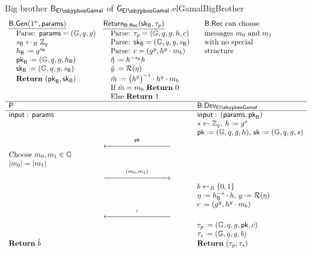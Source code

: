 \begin{intGame}{Big brother $\bb_{\elGamal}$ of $\cgame_{\elGamal}$.}{elGamalBigBrother}
\begin{align*}
\begin{array}{lll}
\underline{\bbgen(1^n,\params)} & \underline{\return_{\bbrec}(\bbsk,\ptrans)} & \quad\mbox{$\bbrec$ can choose} \\
\quad\mbox{Parse: } \params = (\cgroup,\order,\generator) & \quad\mbox{Parse: } \ptrans = (\cgroup,\order,\generator,h,c) & \quad\mbox{messages $m_0$ and $m_1$} \\
\quad s_{\bb}\unileft\Zq & \quad\mbox{Parse: } \bbsk = (\cgroup,\order,\generator,s_{\bb}) & \quad\mbox{with no special} \\
\quad h_{\bb} \defeq g^{s_{\bb}} & \quad\mbox{Parse: } c = (g^y,h^y\cdot m_b) & \quad\mbox{structure} \\
\quad \bbpk \defeq (\cgroup,\order,\generator,h_{\bb}) & \quad\hat{\eta}\defeq h^{-s_{\bb}}h &  \\
\quad \bbsk \defeq (\cgroup,\order,\generator,s_{\bb}) & \quad \hat{y} \defeq \RO(\eta) & \\
\quad\mbox{\Ret } (\bbpk,\bbsk) & \quad \hat{m} \defeq \left(h^{\hat{y}}\right)^{-1}\cdot h^y\cdot m_b & \\
 & \quad\mbox{If } \hat{m} = m_0 \mbox{ \Ret } 0 & \\
 & \quad\mbox{Else \Ret } 1 & \\
\hline \party &  & \bbdev_{\elGamal} \\ 
\hline \I: \, \params &  & \I:\,(\params,\bbpk) \\ 
 &  & s\leftarrow\Zq,\: h\defeq g^s \\
 & & \pk \defeq (\cgroup,\order,\generator,h),\, \sk \defeq (\cgroup,\order,\generator,s) \\
 & \longleftar{\pk}{3} &  \\
\mbox{Choose } m_0,m_1\in\cgroup & & \\
\vert m_0\vert = \vert m_1\vert & & \\
 & \longrightar{(m_0,m_1)}{3} & \\
 & & b\unileft\{0,1\} \\
 & & \eta \defeq h_{\bb}^{-s}\cdot h,\, y \defeq \RO(\eta) \\
 & & c \defeq (g^y, h^y\cdot m_b) \\
 & \longleftar{c}{3} & \\
 & & \ptrans \defeq (\cgroup,\order,\generator,\pk,c) \\
 & & \strans \defeq (\cgroup,\order,\generator,b) \\
\Ret \hat{b} & & \Ret (\ptrans,\strans) \\
\end{array} 
\end{align*}
\end{intGame}

